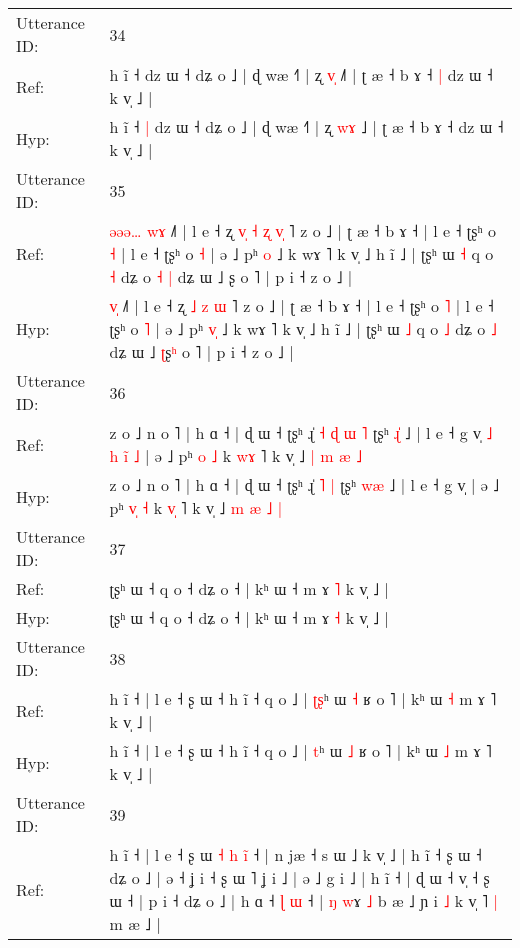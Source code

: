 \documentclass[10pt]{article}
\DeclareRobustCommand{\hl}[1]{{\textcolor{red}{#1}}}
\begin{document}
\begin{longtable}{ll}
 \\
\midrule
Utterance ID: & 34 \\
Ref: & h ĩ ˧\hl{}\hl{} dz ɯ ˧ dʑ o ˩ | ɖ wæ ˧˥ | ʐ \hl{v}\hl{̩} ˩\hl{˥} | ʈ æ ˧ b ɤ ˧\hl{ }\hl{|} dz ɯ ˧ k v̩ ˩ |
 \\
Hyp: & h ĩ ˧\hl{ }\hl{|} dz ɯ ˧ dʑ o ˩ | ɖ wæ ˧˥ | ʐ \hl{w}\hl{ɤ} ˩\hl{} | ʈ æ ˧ b ɤ ˧\hl{}\hl{} dz ɯ ˧ k v̩ ˩ |
 \\
\midrule
Utterance ID: & 35 \\
Ref: & \hl{ə}\hl{ə}\hl{ə}\hl{…}\hl{ }\hl{w}\hl{ɤ} ˩˥ | l e ˧ ʐ\hl{ }\hl{v}\hl{̩} \hl{˧} \hl{ʐ} \hl{v}\hl{̩} ˥ z o ˩ | ʈ æ ˧ b ɤ ˧ | l e ˧ ʈʂʰ o \hl{˧} | l e ˧ ʈʂʰ o \hl{˧} | ə ˩ pʰ \hl{}\hl{o} ˩ k wɤ ˥ k v̩ ˩ h ĩ ˩ | ʈʂʰ ɯ \hl{˧} q o \hl{˧} dʑ o\hl{ }\hl{˧} \hl{|} dʑ ɯ ˩ \hl{}ʂ\hl{} o ˥ | p i ˧ z o ˩ |
 \\
Hyp: & \hl{}\hl{}\hl{}\hl{}\hl{}\hl{v}\hl{̩} ˩˥ | l e ˧ ʐ\hl{}\hl{}\hl{} \hl{˩} \hl{z} \hl{}\hl{ɯ} ˥ z o ˩ | ʈ æ ˧ b ɤ ˧ | l e ˧ ʈʂʰ o \hl{˥} | l e ˧ ʈʂʰ o \hl{˥} | ə ˩ pʰ \hl{v}\hl{̩} ˩ k wɤ ˥ k v̩ ˩ h ĩ ˩ | ʈʂʰ ɯ \hl{˩} q o \hl{˩} dʑ o\hl{}\hl{} \hl{˩} dʑ ɯ ˩ \hl{ʈ}ʂ\hl{ʰ} o ˥ | p i ˧ z o ˩ |
 \\
\midrule
Utterance ID: & 36 \\
Ref: & z o ˩ n o ˥ | h ɑ ˧ | ɖ ɯ ˧ ʈʂʰ ɻ̍\hl{ }\hl{˧}\hl{ }\hl{ɖ} \hl{ɯ} \hl{˥} ʈʂʰ \hl{ɻ}\hl{̍} ˩ | l e ˧ g v̩\hl{ }\hl{˩}\hl{ }\hl{h}\hl{ }\hl{i}\hl{̃}\hl{ }\hl{˩} | ə ˩ pʰ \hl{}\hl{o} \hl{˩} k \hl{w}\hl{ɤ} ˥ k v̩ ˩ \hl{|} \hl{m} \hl{æ} \hl{˩}
 \\
Hyp: & z o ˩ n o ˥ | h ɑ ˧ | ɖ ɯ ˧ ʈʂʰ ɻ̍\hl{}\hl{}\hl{}\hl{} \hl{˥} \hl{|} ʈʂʰ \hl{w}\hl{æ} ˩ | l e ˧ g v̩\hl{}\hl{}\hl{}\hl{}\hl{}\hl{}\hl{}\hl{}\hl{} | ə ˩ pʰ \hl{v}\hl{̩} \hl{˧} k \hl{v}\hl{̩} ˥ k v̩ ˩ \hl{m} \hl{æ} \hl{˩} \hl{|}
 \\
\midrule
Utterance ID: & 37 \\
Ref: & ʈʂʰ ɯ ˧ q o ˧ dʑ o ˧ | kʰ ɯ ˧ m ɤ \hl{˥} k v̩ ˩ |
 \\
Hyp: & ʈʂʰ ɯ ˧ q o ˧ dʑ o ˧ | kʰ ɯ ˧ m ɤ \hl{˧} k v̩ ˩ |
 \\
\midrule
Utterance ID: & 38 \\
Ref: & h ĩ ˧ | l e ˧ ʂ ɯ ˧ h ĩ ˧ q o ˩ | \hl{ʈ}\hl{ʂ}ʰ ɯ \hl{˧} ʁ o ˥ | kʰ ɯ \hl{˧} m ɤ ˥ k v̩ ˩ |
 \\
Hyp: & h ĩ ˧ | l e ˧ ʂ ɯ ˧ h ĩ ˧ q o ˩ | \hl{}\hl{t}ʰ ɯ \hl{˩} ʁ o ˥ | kʰ ɯ \hl{˩} m ɤ ˥ k v̩ ˩ |
 \\
\midrule
Utterance ID: & 39 \\
Ref: & h ĩ ˧ | l e ˧ ʂ ɯ\hl{ }\hl{˧}\hl{ }\hl{h}\hl{ }\hl{i}\hl{̃} ˧ | n jæ ˧ s ɯ ˩ k v̩ ˩ | h ĩ ˧ ʂ ɯ ˧ dʑ o ˩ | ə ˧ ʝ i ˧ ʂ ɯ ˥ ʝ i ˩ | ə ˩ g i ˩ | h ĩ ˧ | ɖ ɯ ˧ v̩ ˧ ʂ ɯ ˧ | p i ˧ dʑ o ˩ | h ɑ ˧ \hl{ɭ} \hl{}\hl{ɯ} ˧ | \hl{ŋ} \hl{w}ɤ \hl{˩} b æ ˩ ɲ i \hl{˩} k v̩ ˥\hl{ }\hl{|} m æ ˩ |

\end{longtable}
\end{document}
